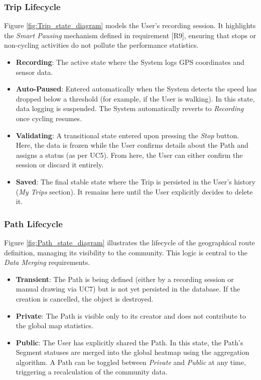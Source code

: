 \subsubsection*{Trip Lifecycle}
Figure \ref{fig:Trip_state_diagram} models the User's recording session. It highlights the \emph{Smart Pausing} mechanism defined in requirement [R9], ensuring that stops or non-cycling activities do not pollute the performance statistics.

\begin{itemize}
    \item \textbf{Recording}: The active state where the System logs GPS coordinates and sensor data.
    \item \textbf{Auto-Paused}: Entered automatically when the System detects the speed has dropped below a threshold (for example, if the User is walking). In this state, data logging is suspended. The System automatically reverts to \emph{Recording} once cycling resumes.
    \item \textbf{Validating}: A transitional state entered upon pressing the \emph{Stop} button. Here, the data is frozen while the User confirms details about the Path and assigns a status (as per UC5). From here, the User can either confirm the session or discard it entirely.
    \item \textbf{Saved}: The final stable state where the Trip is persisted in the User's history (\emph{My Trips} section). It remains here until the User explicitly decides to delete it.
\end{itemize}

\subsubsection*{Path Lifecycle}
Figure \ref{fig:Path_state_diagram} illustrates the lifecycle of the geographical route definition, managing its visibility to the community. This logic is central to the \emph{Data Merging} requirements.

\begin{itemize}
    \item \textbf{Transient}: The Path is being defined (either by a recording session or manual drawing via UC7) but is not yet persisted in the database. If the creation is cancelled, the object is destroyed.
    \item \textbf{Private}: The Path is visible only to its creator and does not contribute to the global map statistics.
    \item \textbf{Public}: The User has explicitly shared the Path. In this state, the Path's Segment statuses are merged into the global heatmap using the aggregation algorithm. A Path can be toggled between \emph{Private} and \emph{Public} at any time, triggering a recalculation of the community data.
\end{itemize}



